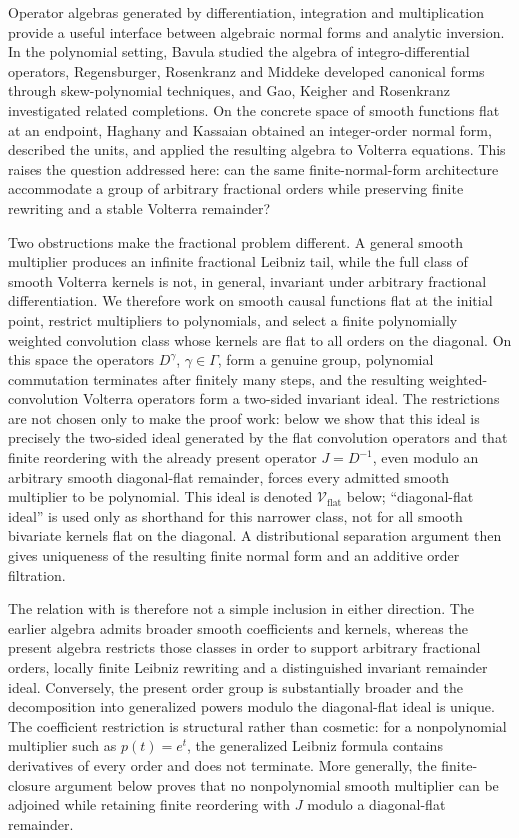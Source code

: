 \documentclass[11pt]{article}
\numberwithin{equation}{section}
\theoremstyle{definition}
\theoremstyle{remark}
\newcommand{\Vflat}{\mathcal V_{\mathrm{flat}}}
\begin{document}
Operator algebras generated by differentiation, integration and multiplication provide a useful interface between algebraic normal forms and analytic inversion. In the polynomial setting, Bavula \cite{Bavula2011} studied the algebra of integro-differential operators, Regensburger, Rosenkranz and Middeke \cite{Regensburger2009} developed canonical forms through skew-polynomial techniques, and Gao, Keigher and Rosenkranz \cite{Gao2017} investigated related completions. On the concrete space of smooth functions flat at an endpoint, Haghany and Kassaian \cite{Haghany2019} obtained an integer-order normal form, described the units, and applied the resulting algebra to Volterra equations. This raises the question addressed here: can the same finite-normal-form architecture accommodate a group of arbitrary fractional orders while preserving finite rewriting and a stable Volterra remainder?

Two obstructions make the fractional problem different. A general smooth multiplier produces an infinite fractional Leibniz tail, while the full class of smooth Volterra kernels is not, in general, invariant under arbitrary fractional differentiation. We therefore work on smooth causal functions flat at the initial point, restrict multipliers to polynomials, and select a finite polynomially weighted convolution class whose kernels are flat to all orders on the diagonal. On this space the operators $D^\gamma$, $\gamma\in\Gamma$, form a genuine group, polynomial commutation terminates after finitely many steps, and the resulting weighted-convolution Volterra operators form a two-sided invariant ideal. The restrictions are not chosen only to make the proof work: below we show that this ideal is precisely the two-sided ideal generated by the flat convolution operators and that finite reordering with the already present operator $J=D^{-1}$, even modulo an arbitrary smooth diagonal-flat remainder, forces every admitted smooth multiplier to be polynomial. This ideal is denoted $\Vflat$ below; ``diagonal-flat ideal'' is used only as shorthand for this narrower class, not for all smooth bivariate kernels flat on the diagonal. A distributional separation argument then gives uniqueness of the resulting finite normal form and an additive order filtration.

The relation with \cite{Haghany2019} is therefore not a simple inclusion in either direction. The earlier algebra admits broader smooth coefficients and kernels, whereas the present algebra restricts those classes in order to support arbitrary fractional orders, locally finite Leibniz rewriting and a distinguished invariant remainder ideal. Conversely, the present order group is substantially broader and the decomposition into generalized powers modulo the diagonal-flat ideal is unique. The coefficient restriction is structural rather than cosmetic: for a nonpolynomial multiplier such as $p(t)=e^t$, the generalized Leibniz formula contains derivatives of every order and does not terminate. More generally, the finite-closure argument below proves that no nonpolynomial smooth multiplier can be adjoined while retaining finite reordering with $J$ modulo a diagonal-flat remainder.
\end{document}
